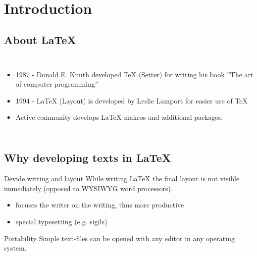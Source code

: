 \section{Introduction}
\subsection{About \LaTeX}

\begin{frame}
	\begin{columns}[onlytextwidth]
			\begin{itemize}
				 \item 1987 - Donald E. Knuth developed \TeX{} (Setter) for writing his book
				''The art of computer programming''
				\item  1994 - \LaTeX{} (Layout) is developed by Leslie Lamport for
					easier use of {\TeX}
				\item  Active community develops \LaTeX{} makros and additional packages.
			\end{itemize}
	\end{columns}
\end{frame}

\subsection{Why developing texts in \LaTeX{}}
\begin{frame}
	\begin{block}{Devide writing and layout}
		While writing \LaTeX{} the final layout is not visible immediately
		(opposed to WYSIWYG word processors). 
		\begin{itemize}
			\item focuses the writer on the writing, thus more productive
			\item special typesetting (e.g. sigils)
		\end{itemize}
	\end{block}

	\begin{block}{Portability}
		Simple text-files can be opened with any editor in any operating 
		system.
	\end{block}
\end{frame}

